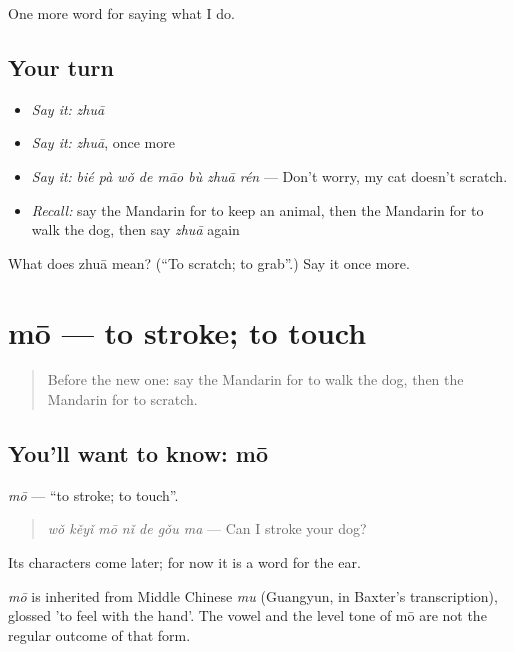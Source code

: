 \begin{grammarlens}[title={What you've built}]
One more word for saying what I do.
\end{grammarlens}

\subsection*{Your turn}
\begin{itemize}
\raggedright
  \item \emph{Say it:} \emph{zhuā}
  \item \emph{Say it:} \emph{zhuā}, once more
  \item \emph{Say it:} \emph{bié pà wǒ de māo bù zhuā rén} — Don't worry, my cat doesn't scratch.
  \item \emph{Recall:} say the Mandarin for to keep an animal, then the Mandarin for to walk the dog, then say \emph{zhuā} again
\end{itemize}

\begin{tcolorbox}[breakable,colback=teal!4,colframe=teal!35!black,title={Before you move on}]
What does zhuā mean? (\textquotedblleft{}To scratch; to grab\textquotedblright{}.) Say it once more.
\end{tcolorbox}
\section[mō]{mō — to stroke; to touch}

\label{lesson:ZH-C229-mo}



\begin{quote}
Before the new one: say the Mandarin for to walk the dog, then the Mandarin for to scratch.
\end{quote}

\subsection*{You'll want to know: mō}
\emph{mō} — \textquotedblleft{}to stroke; to touch\textquotedblright{}.

\begin{quote}
\emph{wǒ kěyǐ mō nǐ de gǒu ma} — Can I stroke your dog?
\end{quote}

Its characters come later; for now it is a word for the ear.

\begin{cousinweb}
\emph{mō} is inherited from Middle Chinese \emph{mu} (Guangyun, in Baxter's transcription), glossed 'to feel with the hand'. The vowel and the level tone of mō are not the regular outcome of that form.
\end{cousinweb}

